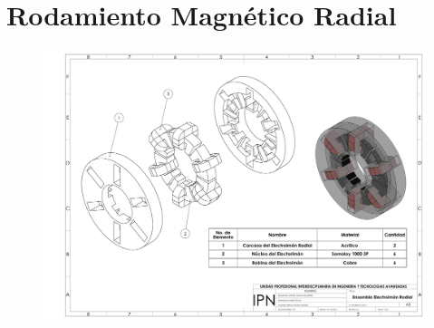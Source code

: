 \chapter{Rodamiento Magn\'etico Radial}

\newpage

\begin{figure}[t]
\centering
	\includegraphics[width=\textheight, height=\textwidth, angle=270]{images/Apendices/Plano_EIR}
\end{figure}